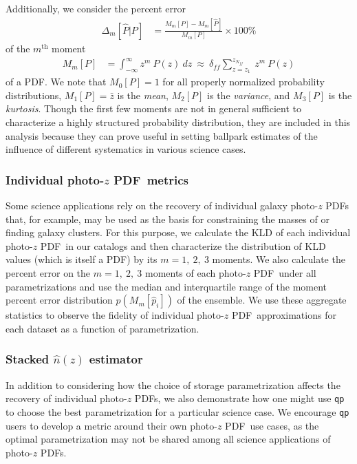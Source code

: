 \documentclass[\docopts]{\docclass}
\newcommand{\pz}{photo-$z$ PDF}
\begin{document}
Additionally, we consider the percent error
\begin{align}
  \label{eq:percent_error}
  \Delta_{m}[\hat{P} | P] &= \frac{M_{m}[P] - 
M_{m}[\hat{P}]}{M_{m}[P]}\times100\%
\end{align}
of the $m^{\mathrm{th}}$ moment
\begin{align}
  \label{eq:moment}
  M_{m}[P] &= \int_{-\infty}^{\infty} z^{m}\ P(z)\ dz\ \approx\  
\delta_{ff}\sum_{z=z_{1}}^{z_{N_{ff}}}\ z^{m}\ P(z)
\end{align}
of a PDF.
We note that $M_{0}[P]=1$ for all properly normalized probability 
distributions, $M_{1}[P]=\bar{z}$ is the \textit{mean}, $M_{2}[P]$ is the 
\textit{variance}, and $M_{3}[P]$ is the \textit{kurtosis}.
Though the first few moments are not in general sufficient to characterize a 
highly structured probability distribution, they are included in this analysis 
because they can prove useful in setting ballpark estimates of the influence of 
different systematics in various science cases.

\subsubsection{Individual \pz\ metrics}
\label{sec:individual_metric}

Some science applications rely on the recovery of individual galaxy \pz s that, 
for example, may be used as the basis for constraining the masses of 
\citep{applegate_weighing_2014} or finding \citep{radovich_searching_2017} 
galaxy clusters.
For this purpose, we calculate the KLD of each individual \pz\ in our catalogs 
and then characterize the distribution of KLD values (which is itself a PDF) by 
its $m=1,\ 2,\ 3$ moments.
We also calculate the percent error on the $m=1,\ 2,\ 3$ moments of each \pz\ 
under all parametrizations and use the median and interquartile range of the 
moment percent error distribution $p(M_{m}[\hat{p}_{i}])$ of the ensemble.
We use these aggregate statistics to observe the fidelity of individual \pz\ 
approximations for each dataset as a function of parametrization.

\subsubsection{Stacked $\hat{n}(z)$ estimator}
\label{sec:stacked_metric}

In addition to considering how the choice of storage parametrization affects 
the recovery of individual \pz s, we also demonstrate how one might use 
\texttt{qp} to choose the best parametrization for a particular science case.
We encourage \texttt{qp} users to develop a metric around their own \pz\ use 
cases, as the optimal parametrization may not be shared among all science 
applications of \pz s.
\end{document}
